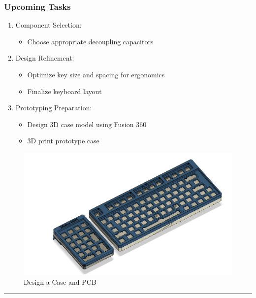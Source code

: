 \documentclass[a4paper,11pt]{article}%
\begin{document}
\subsubsection{Upcoming Tasks}
\begin{enumerate}
    \item Component Selection:
    \begin{itemize}
        \item Choose appropriate decoupling capacitors
    \end{itemize}
    \item Design Refinement:
    \begin{itemize}
        \item Optimize key size and spacing for ergonomics
        \item Finalize keyboard layout
    \end{itemize}
    \item Prototyping Preparation:
    \begin{itemize}
        \item Design 3D case model using Fusion 360
        \item 3D print prototype case
    \end{itemize}
\end{enumerate}

\begin{figure}[H]
	\centering
	\includegraphics[scale=0.17]{figures/3d_print_fusion.png}
	\caption{Design a Case and PCB}
\end{figure}

\pagebreak


\hrule






\end{document}
